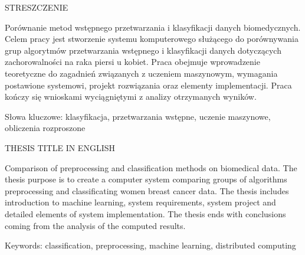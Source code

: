\documentclass[../thesis.tex]{subfiles}
\begin{document}
\begin{center}
\fontsize{14pt}{18pt}\selectfont
STRESZCZENIE
\end{center}

\begin{flushleft}
Porównanie metod wstępnego przetwarzania i klasyfikacji danych biomedycznych. Celem pracy jest stworzenie systemu komputerowego służącego do porównywania grup algorytmów przetwarzania wstępnego i klasyfikacji danych dotyczących zachorowalności na raka piersi u kobiet. Praca obejmuje wprowadzenie teoretyczne do zagadnień związanych z uczeniem maszynowym, wymagania postawione systemowi, projekt rozwiązania oraz elementy implementacji. Praca kończy się wnioskami wyciągniętymi z analizy otrzymanych wyników.

\vspace{7.5cm}

Słowa kluczowe: klasyfikacja, przetwarzania wstępne, uczenie maszynowe, obliczenia rozproszone
\end{flushleft}

\noindent\makebox[\linewidth]{\rule{\linewidth}{0.4pt}}

\begin{center}
\fontsize{14pt}{18pt}\selectfont
THESIS TITLE IN ENGLISH
\end{center}

\begin{flushleft}
Comparison of preprocessing and classification methods on biomedical data. The thesis purpose is to create a computer system comparing groups of algorithms preprocessing and classificating women breast cancer data. The thesis includes introduction to machine learning, system requirements, system project and detailed elements of system implementation. The thesis ends with conclusions coming from the analysis of the computed results.

\vspace{7.5cm}

Keywords: classification, preprocessing, machine learning, distributed computing
\end{flushleft}

\thispagestyle{empty}
\cleardoublepage 
\end{document}
